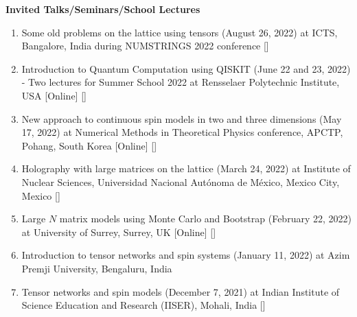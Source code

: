 \vspace{2mm} 
\textcolor{alizarin}{\textbf{\fontsize{10}{38} \bfseries Invited Talks/Seminars/School Lectures}}

\begin{enumerate}

 \item Some old problems on the lattice using tensors (August 26, 2022) at ICTS, Bangalore, India during NUMSTRINGS 2022
 conference [] \vspace{1mm} 

 \item Introduction to Quantum Computation using \textsc{QISKIT} (June 22 and 23, 2022) - Two lectures for 
Summer School 2022 at Rensselaer Polytechnic Institute, USA [Online]  
  [] \vspace{1mm} 

 \item New approach to continuous spin models in two and three dimensions
 (May 17, 2022) at Numerical Methods in Theoretical Physics conference, APCTP, Pohang, South Korea [Online]  
 []
 \vspace{1mm} 
 
 \item Holography with large matrices on the lattice (March 24, 2022) at Institute of Nuclear Sciences, 
 Universidad Nacional Aut\'{o}noma de M\'{e}xico, Mexico City, Mexico   
  []
 \vspace{1mm}%
 
\item Large $N$ matrix models using Monte Carlo and Bootstrap
 (February 22, 2022) at University of Surrey, Surrey, UK [Online]  
 []
 \vspace{1mm} 
 
 \item Introduction to tensor networks and spin systems 
 (January 11, 2022) at Azim Premji University, Bengaluru, India  \vspace{1mm} 
 
 \item Tensor networks and spin models 
 (December 7, 2021) at Indian Institute of Science Education and Research (IISER), Mohali, India 
 []  \vspace{1mm} 
 

\end{enumerate}
